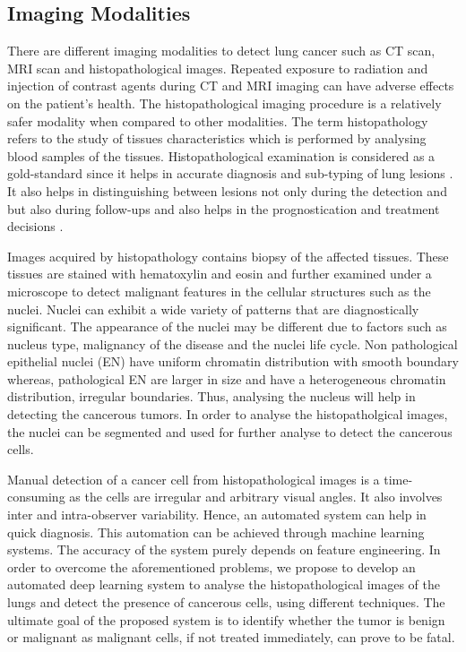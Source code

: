 \documentclass[conference]{IEEEtran}
\begin{document}
\subsection{Imaging Modalities}
There are different imaging modalities to detect lung cancer such as CT scan, MRI scan and histopathological images. Repeated exposure to radiation and injection of contrast agents during CT and MRI imaging can have adverse effects on the patient's health. The histopathological imaging procedure is a relatively safer modality when compared to other modalities. The term histopathology refers to the study of tissues characteristics which is performed by analysing blood samples of the tissues. Histopathological examination is considered as a gold-standard since it helps in accurate diagnosis and sub-typing of lung lesions \cite{histo_study_lungbiopsy}. It also helps in distinguishing between lesions not only during the detection and but also during follow-ups and also helps in the prognostication and treatment decisions \cite{histopath_role}. 

Images acquired by histopathology contains biopsy of the affected tissues. These tissues are stained with hematoxylin and eosin and further examined under a microscope to detect malignant features in the cellular structures such as the nuclei. Nuclei can exhibit a wide variety of patterns that are diagnostically significant. The appearance of the nuclei may be different due to factors such as nucleus type, malignancy of the disease and the nuclei life cycle. Non pathological epithelial nuclei (EN) have uniform chromatin distribution with smooth boundary whereas,  pathological EN are larger in size and have a heterogeneous chromatin distribution, irregular boundaries\cite{irshad}. Thus, analysing the nucleus will help in detecting the cancerous tumors. In order to analyse the histopatholgical images, the nuclei can be segmented and used for further analyse to detect the cancerous cells.

Manual detection of a cancer cell from histopathological images is a time-consuming as the cells are irregular and arbitrary visual angles. It also involves inter and intra-observer variability\cite{sumaiya}. Hence, an automated system can help in quick diagnosis. This automation can be achieved through machine learning systems. The accuracy of the system purely depends on feature engineering. In order to overcome the aforementioned problems, we propose to develop an automated deep learning system to analyse the histopathological images of the lungs and detect the presence of cancerous cells, using different techniques. The ultimate goal of the proposed system is to identify whether the tumor is benign or malignant as malignant cells, if not treated immediately, can prove to be fatal.
\end{document}

